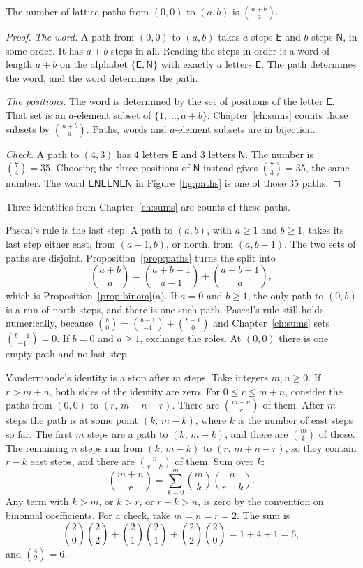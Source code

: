 \begin{proposition}\label{prop:paths}
The number of lattice paths from $(0,0)$ to $(a,b)$ is $\binom{a+b}{a}$.
\end{proposition}
\begin{proof}
\emph{The word.} A path from $(0,0)$ to $(a,b)$ takes $a$ steps $\mathsf E$ and $b$ steps $\mathsf N$, in some order. It has $a+b$ steps in all. Reading the steps in order is a word of length $a+b$ on the alphabet $\{\mathsf E,\mathsf N\}$ with exactly $a$ letters $\mathsf E$. The path determines the word, and the word determines the path.

\emph{The positions.} The word is determined by the set of positions of the letter $\mathsf E$. That set is an $a$-element subset of $\{1,\dots,a+b\}$. Chapter~\ref{ch:sums} counts those subsets by $\binom{a+b}{a}$. Paths, words and $a$-element subsets are in bijection.

\emph{Check.} A path to $(4,3)$ has $4$ letters $\mathsf E$ and $3$ letters $\mathsf N$. The number is $\binom74=35$. Choosing the three positions of $\mathsf N$ instead gives $\binom73=35$, the same number. The word $\mathsf{ENEENEN}$ in Figure~\ref{fig:paths} is one of those $35$ paths.
\end{proof}

Three identities from Chapter~\ref{ch:sums} are counts of these paths.

Pascal's rule is the last step. A path to $(a,b)$, with $a\ge 1$ and $b\ge 1$, takes its last step either east, from $(a-1,b)$, or north, from $(a,b-1)$. The two sets of paths are disjoint. Proposition~\ref{prop:paths} turns the split into
\[
\binom{a+b}{a}=\binom{a+b-1}{a-1}+\binom{a+b-1}{a},
\]
which is Proposition~\ref{prop:binom}(a). If $a=0$ and $b\ge1$, the only path to $(0,b)$ is a run of north steps, and there is one such path. Pascal's rule still holds numerically, because $\binom b0=\binom{b-1}{-1}+\binom{b-1}{0}$ and Chapter~\ref{ch:sums} sets $\binom{b-1}{-1}=0$. If $b=0$ and $a\ge1$, exchange the roles. At $(0,0)$ there is one empty path and no last step.

Vandermonde's identity is a stop after $m$ steps. Take integers $m,n\ge0$. If $r>m+n$, both sides of the identity are zero. For $0\le r\le m+n$, consider the paths from $(0,0)$ to $(r,\,m+n-r)$. There are $\binom{m+n}{r}$ of them. After $m$ steps the path is at some point $(k,\,m-k)$, where $k$ is the number of east steps so far. The first $m$ steps are a path to $(k,\,m-k)$, and there are $\binom mk$ of those. The remaining $n$ steps run from $(k,\,m-k)$ to $(r,\,m+n-r)$, so they contain $r-k$ east steps, and there are $\binom n{r-k}$ of them. Sum over $k$:
\[
\binom{m+n}{r}=\sum_{k=0}^m\binom mk\binom n{r-k}.
\]
Any term with $k>m$, or $k>r$, or $r-k>n$, is zero by the convention on binomial coefficients. For a check, take $m=n=r=2$. The sum is
\[
\binom20\binom22+\binom21\binom21+\binom22\binom20=1+4+1=6,
\]
and $\binom42=6$.


